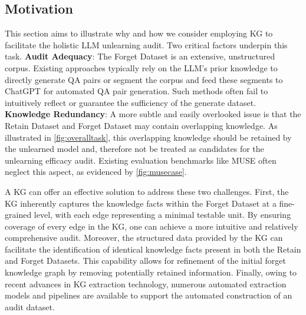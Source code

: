 

\subsection{Motivation}
This section aims to illustrate why and how we consider employing KG to facilitate the holistic LLM unlearning audit. 
Two critical factors underpin this task.
\textbf{Audit Adequacy}: The Forget Dataset is an extensive, unstructured corpus. Existing approaches typically rely on the LLM's prior knowledge to directly generate QA pairs or segment the corpus and feed these segments to ChatGPT for automated QA pair generation. Such methods often fail to intuitively reflect or guarantee the sufficiency of the generate dataset.
\textbf{Knowledge Redundancy}: A more subtle and easily overlooked issue is that the Retain Dataset and Forget Dataset may contain overlapping knowledge. As illustrated in \autoref{fig:overalltask}, this overlapping knowledge should be retained by the unlearned model and, therefore not be treated as candidates for the unlearning efficacy audit. Existing evaluation benchmarks like MUSE often neglect this aspect, as evidenced by \autoref{fig:musecase}.



A KG can offer an effective solution to address these two challenges. 
First, the KG inherently captures the knowledge facts within the Forget Dataset at a fine-grained level, with each edge representing a minimal testable unit. 
By ensuring coverage of every edge in the KG, one can achieve a more intuitive and relatively comprehensive audit. 
Moreover, the structured data provided by the KG can facilitate the identification of identical knowledge facts present in both the Retain and Forget Datasets.
This capability allows for refinement of the initial forget knowledge graph by removing potentially retained information.
Finally, owing to recent advances in KG extraction technology, numerous automated extraction models and pipelines are available to support the automated construction of an audit dataset.

